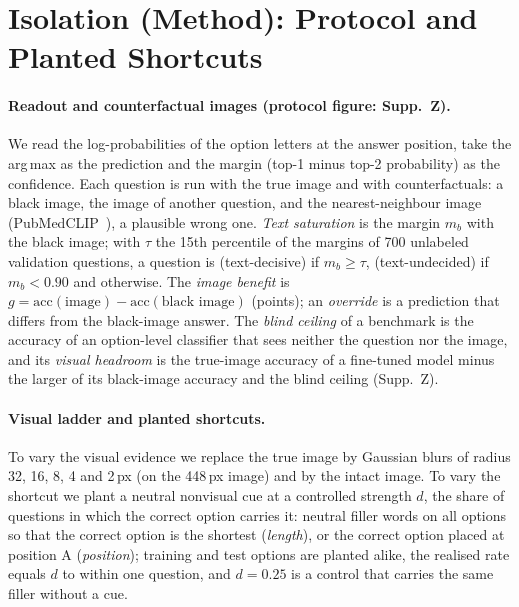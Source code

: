 \section{Isolation (Method): Protocol and Planted Shortcuts}
\label{sec:setting}

\paragraph{Readout and counterfactual images (protocol figure: Supp.~Z).}
We read the log-probabilities of the option letters at the answer position, take the arg\,max as the prediction and the margin (top-1 minus top-2 probability) as the confidence.
Each question is run with the true image and with counterfactuals: a black image, the image of another question, and the nearest-neighbour image (PubMedCLIP~\cite{eslami2023pubmedclip}), a plausible wrong one.
\emph{Text saturation} is the margin $m_b$ with the black image; with $\tau$ the 15th percentile of the margins of 700 unlabeled validation questions, a question is \HI{} (text-decisive) if $m_b\ge\tau$, \LO{} (text-undecided) if $m_b<0.90$ and \MID{} otherwise.
The \emph{image benefit} is $g=\mathrm{acc}(\text{image})-\mathrm{acc}(\text{black image})$ (points); an \emph{override} is a prediction that differs from the black-image answer.
The \emph{blind ceiling} of a benchmark is the accuracy of an option-level classifier that sees neither the question nor the image, and its \emph{visual headroom} is the true-image accuracy of a fine-tuned model minus the larger of its black-image accuracy and the blind ceiling (Supp.~Z).

\paragraph{Visual ladder and planted shortcuts.}
To vary the visual evidence we replace the true image by Gaussian blurs of radius 32, 16, 8, 4 and 2\,px (on the 448\,px image) and by the intact image.
To vary the shortcut we plant a neutral nonvisual cue at a controlled strength $d$, the share of questions in which the correct option carries it: neutral filler words on all options so that the correct option is the shortest (\emph{length}), or the correct option placed at position A (\emph{position}); training and test options are planted alike, the realised rate equals $d$ to within one question, and $d=0.25$ is a control that carries the same filler without a cue.

